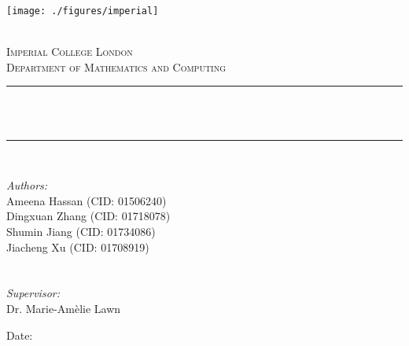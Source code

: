 \begin{titlepage}

\newcommand{\HRule}{\rule{\linewidth}{0.5mm}} %



\texttt{[image: ./figures/imperial]}\\[0.5cm] 

\begin{center} %

\textsc{\LARGE \reporttype}\\[1.5cm] 
\textsc{\Large Imperial College London}\\[0.5cm] 
\textsc{\large Department of Mathematics and Computing}\\[0.5cm] 

\HRule \\[0.4cm]
{ \huge \bfseries \reporttitle}\\ %
\HRule \\[1.5cm]
\end{center}

\textit{Authors:} \\
Ameena Hassan (CID: 01506240) \\
Dingxuan Zhang (CID: 01718078) \\
Shumin Jiang (CID: 01734086) \\
Jiacheng Xu (CID: 01708919) \\
\\
\\
\textit{Supervisor: }\\
Dr. Marie-Amèlie Lawn

\vspace{2cm}
\makeatletter
Date: \@date 

\vfill %



\makeatother


\end{titlepage}

